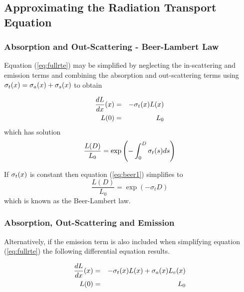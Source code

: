 %
%

\subsection{Approximating the Radiation Transport Equation}

%
%

\subsubsection{Absorption and Out-Scattering - Beer-Lambert Law}
Equation (\ref{eq:fullrte}) may be simplified by neglecting the
in-scattering and emission terms and combining the absorption and
out-scattering terms using $\sigma_t(x)=\sigma_a(x)+\sigma_s(x)$ to obtain

\begin{eqnarray*}
\frac{dL}{dx}(x)&=&-\sigma_t(x) L(x)\\
L(0)&=&L_0
\end{eqnarray*}
which has solution
\begin{equation}
\label{eq:beer1} \frac{L(D)}{L_0}=\exp\left({-\int_0^D \sigma_t(s) ds}\right)
\end{equation}

If $\sigma_t(x)$ is constant then equation (\ref{eq:beer1}) simplifies
to
\begin{equation}
\label{eq:beer2} \frac{L(D)}{L_0}=\exp(-\sigma_t D)
\end{equation}
which is known as the Beer-Lambert law\cite{}.

%
%

\subsubsection{Absorption, Out-Scattering and Emission}
Alternatively, if the emission term is also included when
simplifying equation (\ref{eq:fullrte})  the following
differential equation results.

\begin{eqnarray}
\label{eq:simple_rte}
\frac{dL}{dx}(x)&=&-\sigma_t(x) L(x) + \sigma_a(x) L_e(x)\\
 L(0)&=&L_0\nonumber
\end{eqnarray}

